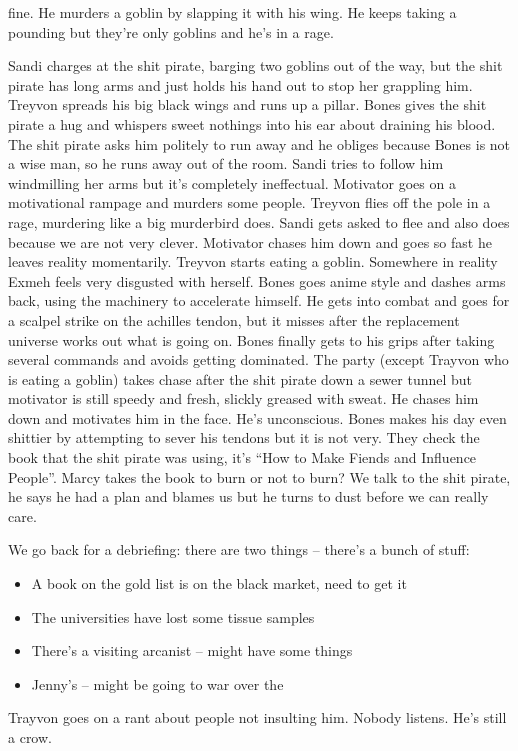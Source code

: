 fine. He murders a goblin by slapping it with his wing. He keeps taking a pounding but they’re only goblins and he’s in a rage.\medskip

Sandi charges at the shit pirate, barging two goblins out of the way, but the shit pirate has long arms and just holds his hand out to stop her grappling him. Treyvon spreads his big black wings and runs up a pillar. Bones gives the shit pirate a hug and whispers sweet nothings into his ear about draining his blood. The shit pirate asks him politely to run away and he obliges because Bones is not a wise man, so he runs away out of the room. Sandi tries to follow him windmilling her arms but it’s completely ineffectual. Motivator goes on a motivational rampage and murders some people. Treyvon flies off the pole in a rage, murdering like a big murderbird does. Sandi gets asked to flee and also does because we are not very clever. Motivator chases him down and goes so fast he leaves reality momentarily. Treyvon starts eating a goblin. Somewhere in reality Exmeh feels very disgusted with herself. Bones goes anime style and dashes arms back, using the machinery to accelerate himself. He gets into combat and goes for a scalpel strike on the achilles tendon, but it misses after the replacement universe works out what is going on. Bones finally gets to his grips after taking several commands and avoids getting dominated. The party (except Trayvon who is eating a goblin) takes chase after the shit pirate down a sewer tunnel but motivator is still speedy and fresh, slickly greased with sweat. He chases him down and motivates him in the face. He’s unconscious. Bones makes his day even shittier by attempting to sever his tendons but it is not very. They check the book that the shit pirate was using, it’s “How to Make Fiends and Influence People”. Marcy takes the book to burn or not to burn? We talk to the shit pirate, he says he had a plan and blames us but he turns to dust before we can really care.\medskip

We go back for a debriefing: there are two things – there’s a bunch of stuff:\medskip
\begin{itemize}
\item A book on the gold list is on the black market, need to get it
\item The universities have lost some tissue samples
\item There’s a visiting arcanist – might have some things
\item Jenny’s – might be going to war over the
\end{itemize}
Trayvon goes on a rant about people not insulting him. Nobody listens. He’s still a crow.